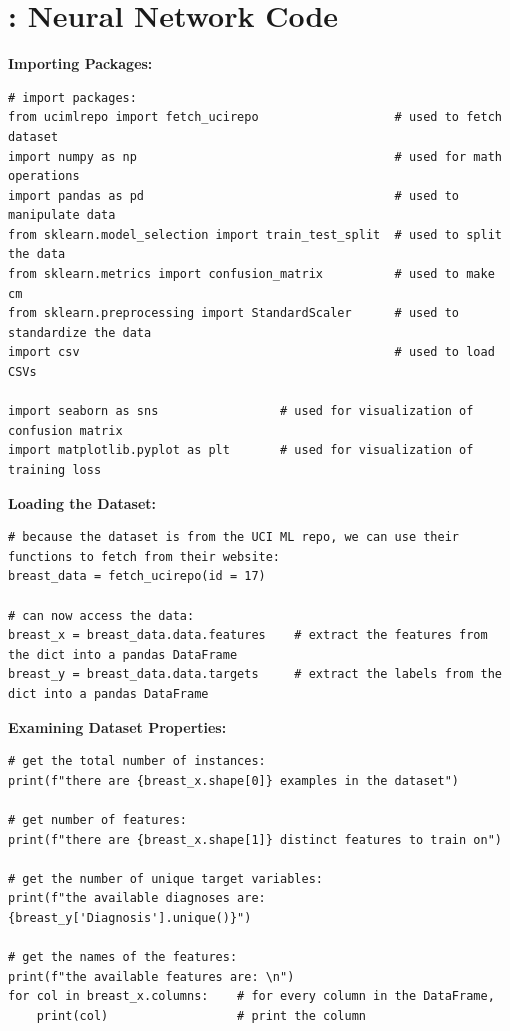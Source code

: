 \documentclass[a4paper]{article}
\begin{document}
\newpage
\section{\hspace{-5mm}: Neural Network Code}
\label{section:ann_code}
\textbf{Importing Packages:}
\begin{lstlisting}[basicstyle= \scriptsize]
# import packages:
from ucimlrepo import fetch_ucirepo                   # used to fetch dataset
import numpy as np                                    # used for math operations
import pandas as pd                                   # used to manipulate data
from sklearn.model_selection import train_test_split  # used to split the data
from sklearn.metrics import confusion_matrix          # used to make cm
from sklearn.preprocessing import StandardScaler      # used to standardize the data
import csv                                            # used to load CSVs

import seaborn as sns                 # used for visualization of confusion matrix
import matplotlib.pyplot as plt       # used for visualization of training loss
\end{lstlisting} 

\textbf{Loading the Dataset:}
\begin{lstlisting}[basicstyle= \scriptsize]
# because the dataset is from the UCI ML repo, we can use their functions to fetch from their website:
breast_data = fetch_ucirepo(id = 17)

# can now access the data:
breast_x = breast_data.data.features    # extract the features from the dict into a pandas DataFrame
breast_y = breast_data.data.targets     # extract the labels from the dict into a pandas DataFrame
\end{lstlisting}

\textbf{Examining Dataset Properties:}
\begin{lstlisting}[basicstyle= \scriptsize]
# get the total number of instances:
print(f"there are {breast_x.shape[0]} examples in the dataset")

# get number of features:
print(f"there are {breast_x.shape[1]} distinct features to train on")

# get the number of unique target variables:
print(f"the available diagnoses are: {breast_y['Diagnosis'].unique()}")

# get the names of the features:
print(f"the available features are: \n")
for col in breast_x.columns:    # for every column in the DataFrame, 
    print(col)                  # print the column    
\end{lstlisting}
\end{document}
